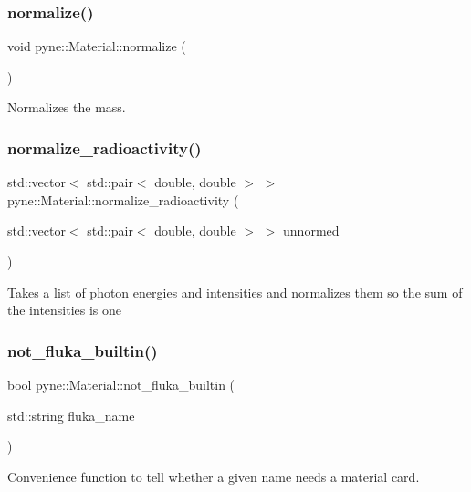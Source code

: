 \subsubsection{\texorpdfstring{normalize()}{normalize()}}
{\footnotesize\ttfamily void pyne\+::\+Material\+::normalize (\begin{DoxyParamCaption}{ }\end{DoxyParamCaption})}

Normalizes the mass. \mbox{\label{classpyne_1_1_material_a114deb10e8d118bbd37ade0fbce5253d}} 
\subsubsection{\texorpdfstring{normalize\+\_\+radioactivity()}{normalize\_radioactivity()}}
{\footnotesize\ttfamily std\+::vector$<$ std\+::pair$<$ double, double $>$ $>$ pyne\+::\+Material\+::normalize\+\_\+radioactivity (\begin{DoxyParamCaption}\item[{std\+::vector$<$ std\+::pair$<$ double, double $>$ $>$}]{unnormed }\end{DoxyParamCaption})}

Takes a list of photon energies and intensities and normalizes them so the sum of the intensities is one \mbox{\label{classpyne_1_1_material_a97461e1c6a87d91ed1293adbe43cb29e}} 
\subsubsection{\texorpdfstring{not\+\_\+fluka\+\_\+builtin()}{not\_fluka\_builtin()}}
{\footnotesize\ttfamily bool pyne\+::\+Material\+::not\+\_\+fluka\+\_\+builtin (\begin{DoxyParamCaption}\item[{std\+::string}]{fluka\+\_\+name }\end{DoxyParamCaption})}



Convenience function to tell whether a given name needs a material card. 

